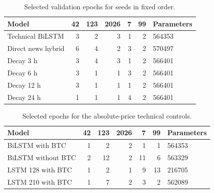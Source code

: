 \begin{table}[!htbp]\centering\small
\caption{Selected validation epochs for seeds in fixed order.}\label{tab:epochs}
\begin{tabular}{lrrrrrl}\toprule
Model & 42 & 123 & 2026 & 7 & 99 & Parameters\\\midrule
Technical BiLSTM & 3 & 2 & 3 & 1 & 2 & 564353 \\
Direct news hybrid & 6 & 4 & 2 & 3 & 2 & 570497 \\
Decay 3 h & 3 & 4 & 3 & 1 & 2 & 566401 \\
Decay 6 h & 3 & 1 & 1 & 3 & 2 & 566401 \\
Decay 12 h & 3 & 1 & 1 & 1 & 2 & 566401 \\
Decay 24 h & 1 & 1 & 1 & 4 & 2 & 566401 \\

\bottomrule\end{tabular}
\end{table}


\begin{table}[!htbp]\centering\small
\caption{Selected epochs for the absolute-price technical controls.}\label{tab:benchepochs}
\begin{tabular}{lrrrrrl}\toprule
Model & 42 & 123 & 2026 & 7 & 99 & Parameters\\\midrule
BiLSTM with BTC & 1 & 2 & 2 & 1 & 1 & 564353 \\
BiLSTM without BTC & 2 & 12 & 2 & 11 & 6 & 563329 \\
LSTM 128 with BTC & 1 & 2 & 1 & 9 & 13 & 216705 \\
LSTM 210 with BTC & 1 & 7 & 2 & 3 & 2 & 562089 \\

\bottomrule\end{tabular}
\end{table}

